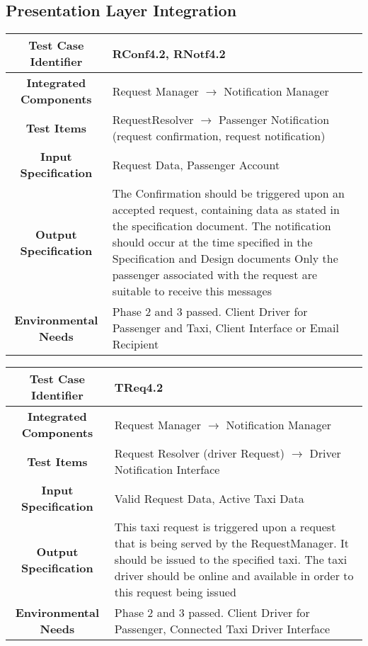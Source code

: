 \documentclass[11pt, a4paper,titlepage]{article}
\begin{document}
	\subsection{Presentation Layer Integration}
			\begin{tabularx}{\textwidth}{| c|X|}
				\hline \textbf{Test Case Identifier} & \label{RConf4.2}RConf4.2, \label{RNotf4.2}RNotf4.2 \\
				\hline \textbf{Integrated Components} & Request Manager $\rightarrow $ Notification Manager \\
				\hline \textbf{Test Items} & RequestResolver $\rightarrow $ Passenger Notification (request confirmation, request notification) \\
				\hline \textbf{Input Specification} & Request Data, Passenger Account \\
				\hline \textbf{Output Specification} & The Confirmation should be triggered upon an accepted request, containing data as stated in the specification document. \newline
				The notification should occur at the time specified in the Specification and Design documents \newline
				Only the passenger associated with the request are suitable to receive this messages 
				\\
				\hline \textbf{Environmental Needs} & Phase 2 and 3 passed. Client Driver for Passenger and Taxi, Client Interface or Email Recipient \\
				\hline
			\end{tabularx}
			\newline
			
			\begin{tabularx}{\textwidth}{| c|X|}
				\hline \textbf{Test Case Identifier} & \label{TReq4.2}TReq4.2 \\
				\hline \textbf{Integrated Components} &  Request Manager $\rightarrow $ Notification Manager \\
				\hline \textbf{Test Items} & Request Resolver (driver Request) $\rightarrow $ Driver Notification Interface \\
				\hline \textbf{Input Specification} & Valid Request Data, Active Taxi Data \\
				\hline \textbf{Output Specification} & This taxi request is triggered upon a request that is being served by the RequestManager. It should be issued to the specified taxi. \newline
				The taxi driver should be online and available in order to this request being issued \\
				\hline \textbf{Environmental Needs} & Phase 2 and 3 passed. Client Driver for Passenger, Connected Taxi Driver Interface \\
				\hline
			\end{tabularx}
			\newline
			
\end{document}
